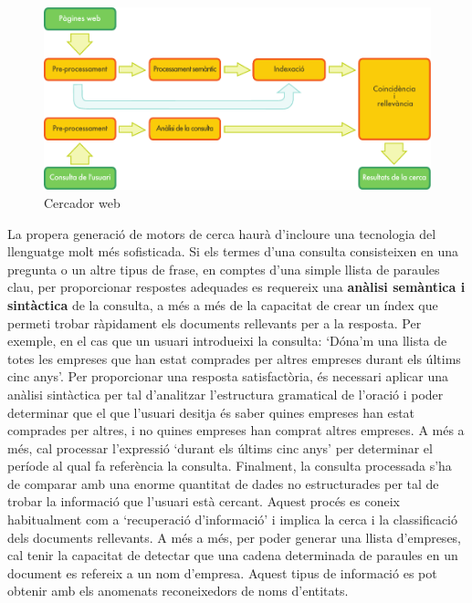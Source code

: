 \begin{multicols}{2}
\begin{figure}[htb]
  \center
  \includegraphics[width=\textwidth]{../_media/catalan/web_search_architecture}
  \vspace{-5mm}
  \caption{Cercador web}
  \label{fig:websearcharch_ca}
\end{figure}

La propera generació de motors de cerca haurà d’incloure una tecnologia del llenguatge molt més sofisticada. Si els termes d’una consulta consisteixen en una pregunta o un altre tipus de frase, en comptes d’una simple llista de paraules clau, per proporcionar respostes adequades es requereix una \textbf{anàlisi semàntica i sintàctica}  de la consulta, a més  a més de la capacitat de crear un índex que permeti trobar ràpidament els documents rellevants per a la resposta. Per exemple, en el cas que un usuari introdueixi la consulta: ‘Dóna’m una llista de totes les empreses que han estat comprades per altres empreses durant els últims cinc anys’. Per proporcionar una resposta satisfactòria, és necessari aplicar una anàlisi sintàctica per tal d’analitzar l’estructura gramatical de l’oració i poder determinar que el que l’usuari desitja és saber quines empreses han estat comprades per altres, i no quines empreses han comprat altres empreses. A més a més, cal processar  l’expressió ‘durant els últims cinc anys’ per determinar el període al qual fa referència la consulta. 
Finalment, la consulta processada s’ha de comparar amb una enorme quantitat de dades no estructurades per tal de trobar la informació que l'usuari està cercant. Aquest procés es coneix habitualment com a ‘recuperació d'informació’ i implica la cerca i la classificació dels documents rellevants. A més a més, per poder generar una llista d’empreses, cal tenir la capacitat de detectar que una cadena determinada de paraules en un document es refereix a un nom d'empresa. Aquest tipus de informació es pot obtenir amb els anomenats reconeixedors de noms d’entitats.


\end{multicols}
